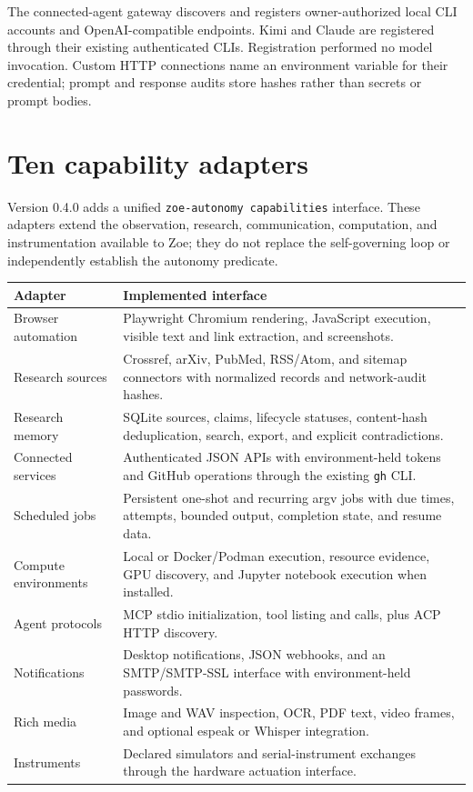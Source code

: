 \documentclass[11pt,a4paper]{article}
\begin{document}
The connected-agent gateway discovers and registers owner-authorized local CLI accounts and OpenAI-compatible endpoints. Kimi and Claude are registered through their existing authenticated CLIs. Registration performed no model invocation. Custom HTTP connections name an environment variable for their credential; prompt and response audits store hashes rather than secrets or prompt bodies.


\section{Ten capability adapters}
Version 0.4.0 adds a unified \texttt{zoe-autonomy capabilities} interface. These adapters extend the observation, research, communication, computation, and instrumentation available to Zoe; they do not replace the self-governing loop or independently establish the autonomy predicate.

\begin{center}
\small
\begin{tabular}{p{3.6cm}p{10.8cm}}
\toprule
Adapter & Implemented interface \\
\midrule
Browser automation & Playwright Chromium rendering, JavaScript execution, visible text and link extraction, and screenshots. \\
Research sources & Crossref, arXiv, PubMed, RSS/Atom, and sitemap connectors with normalized records and network-audit hashes. \\
Research memory & SQLite sources, claims, lifecycle statuses, content-hash deduplication, search, export, and explicit contradictions. \\
Connected services & Authenticated JSON APIs with environment-held tokens and GitHub operations through the existing \texttt{gh} CLI. \\
Scheduled jobs & Persistent one-shot and recurring argv jobs with due times, attempts, bounded output, completion state, and resume data. \\
Compute environments & Local or Docker/Podman execution, resource evidence, GPU discovery, and Jupyter notebook execution when installed. \\
Agent protocols & MCP stdio initialization, tool listing and calls, plus ACP HTTP discovery. \\
Notifications & Desktop notifications, JSON webhooks, and an SMTP/SMTP-SSL interface with environment-held passwords. \\
Rich media & Image and WAV inspection, OCR, PDF text, video frames, and optional espeak or Whisper integration. \\
Instruments & Declared simulators and serial-instrument exchanges through the hardware actuation interface. \\
\bottomrule
\end{tabular}
\end{center}
\end{document}
